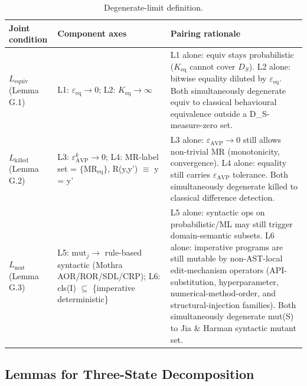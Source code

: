 \documentclass[manuscript,screen,review]{acmart}
\begin{document}
{%
\begin{longtable}[]{@{}
  >{\raggedright\arraybackslash}p{}
  >{\raggedright\arraybackslash}p{}
  >{\raggedright\arraybackslash}p{}@{}}
\caption{Degenerate-limit definition.}\label{tab:p2-29}\\
\toprule\noalign{}
\begin{minipage}[b]{\linewidth}\raggedright
Joint condition
\end{minipage} & \begin{minipage}[b]{\linewidth}\raggedright
Component axes
\end{minipage} & \begin{minipage}[b]{\linewidth}\raggedright
Pairing rationale
\end{minipage} \\
\midrule\noalign{}
\endfirsthead
\endhead
\bottomrule\noalign{}
\endlastfoot
\textbf{$L_{\mathrm{equiv}}$} (Lemma G.1) & L1: $\varepsilon_{\mathrm{eq}} \to 0$; L2: $K_{\mathrm{eq}} \to \infty$ & L1 alone:
equiv stays probabilistic ($K_{\mathrm{eq}}$ cannot cover $D_S$). L2 alone: bitwise
equality diluted by $\varepsilon_{\mathrm{eq}}$. Both simultaneously degenerate equiv to
classical behavioural equivalence outside a D\_S-measure-zero set. \\
\textbf{$L_{\mathrm{killed}}$} (Lemma G.2) & L3: $\varepsilon_{\mathrm{AVP}}^k \to 0$; L4: MR-label set =
$\{\mathrm{MR}_{\mathrm{eq}}\}$, R(y,y') $\equiv$ y = y' & L3 alone: $\varepsilon_{\mathrm{AVP}} \to 0$ still allows
non-trivial MR (monotonicity, convergence). L4 alone: equality still
carries $\varepsilon_{\mathrm{AVP}}$ tolerance. Both simultaneously degenerate killed to
classical difference detection. \\
\textbf{$L_{\mathrm{mut}}$} (Lemma G.3) & L5: $\mathrm{mut}_j \to$ rule-based syntactic (Mothra
AOR/ROR/SDL/CRP); L6: cls(I) $\subseteq$ \{imperative deterministic\} & L5 alone:
syntactic ops on probabilistic/ML may still trigger domain-semantic
subsets. L6 alone: imperative programs are still mutable by non-AST-local
edit-mechanism operators (API-substitution, hyperparameter,
numerical-method-order, and structural-injection families).
Both simultaneously degenerate mut(S) to Jia \& Harman syntactic mutant
set. \\
\end{longtable}
}

\subsection{Lemmas for Three-State Decomposition}\label{g.3-lemmas-three-state-decomposition-degenerates-under-l}
\end{document}
